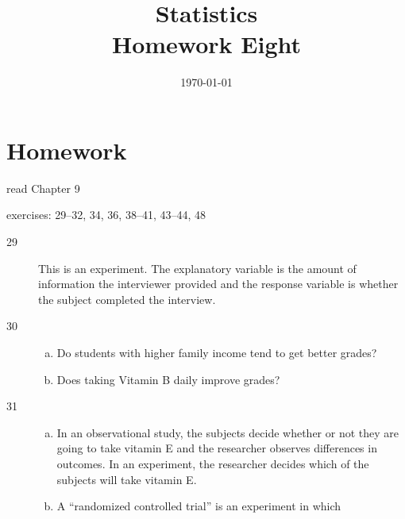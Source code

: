 \documentclass[letterpaper]{exam}
\title{Statistics \\ Homework Eight}
\date{\today}
\author{}
\begin{document}
  \maketitle

  \ifprintanswers{}
  \else
    \section{Homework}
    \begin{itemize*}
      \item read Chapter 9 
      \item exercises: 29--32, 34, 36, 38--41, 43--44, 48
    \end{itemize*}
  \fi

  \ifprintanswers{}
    \begin{description}

      \item[29] 
        This is an experiment.  The explanatory variable is the amount of
        information the interviewer provided and the response variable is
        whether the subject completed the interview.

      \item[30]
        \begin{enumerate}[(a)]
          \item Do students with higher family income tend to get better grades?

          \item Does taking Vitamin B daily improve grades?
        \end{enumerate}

      \item[31]
        \begin{enumerate}[(a)]
          \item In an observational study, the subjects decide whether or not
            they are going to take vitamin E and the researcher observes
            differences in outcomes.  In an experiment, the researcher decides
            which of the subjects will take vitamin E.

          \item A ``randomized controlled trial'' is an experiment in which 


\end{enumerate}
\end{description}
\end{document}
